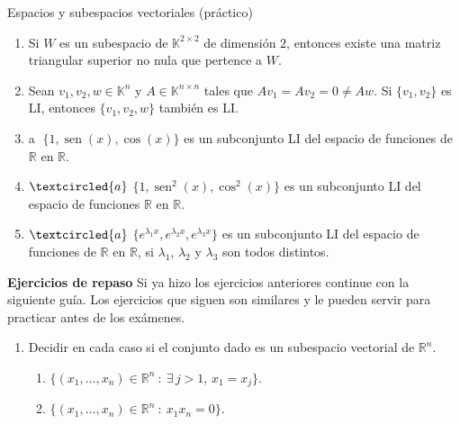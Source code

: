 \begin{chapter}{Espacios y subespacios vectoriales (práctico)}
\begin{enumerate}[resume, topsep=6pt, itemsep=.4cm]
\begin{enumerate}
  \item Si $W$ es un subespacio de $\mathbb{K}^{2\times2}$ de dimensión $2$, entonces existe una matriz triangular superior no nula que pertence a $W$.

 \item Sean $v_1, v_2, w\in \mathbb{K}^{n}$ y $A\in\mathbb{K}^{n\times n}$ tales que $Av_1=Av_2=0\neq Aw$. Si $\{v_1, v_2\}$ es LI, entonces $\{v_1,v_2,w\}$ también es LI.

\item\label{cos} \textcircled{a} $\{1, \operatorname{sen}(x),\cos(x)\}$ es un subconjunto LI del espacio de funciones de $\mathbb{R}$ en $\mathbb{R}$.

\item\label{cos2} $\textcircled{a}$ $\{1,\operatorname{sen}^2(x),\cos^2(x)\}$ es un subconjunto LI del espacio de funciones $\mathbb{R}$ en $\mathbb{R}$.

\item\label{exponencial} $\textcircled{a}$ $\{e^{\lambda_1x},e^{\lambda_2x},e^{\lambda_3x}\}$ es un subconjunto LI del espacio de funciones de
$\mathbb{R}$ en $\mathbb{R}$, si $\lambda_1$, $\lambda_2$ y $\lambda_3$ son todos distintos.
\end{enumerate}

%



\end{enumerate}


\textbf{Ejercicios de repaso}
Si ya hizo los ejercicios anteriores continue con la siguiente guía. Los ejercicios que siguen son similares y le pueden servir para practicar antes de los exámenes.


\begin{enumerate}[resume, topsep=6pt, itemsep=.4cm]

\item Decidir en cada caso si el conjunto dado es un subespacio vectorial de $\mathbb{R}^{n}$.
    \begin{enumerate}
        \item $\{(x_1, \ldots ,x_n) \in \mathbb{R}^n \ : \ \exists \, j > 1, \, x_1 = x_j\}$.
        \item $\{(x_1, \ldots , x_n) \in\mathbb{R}^n \ : \ x_1x_n = 0 \}$.
    \end{enumerate}



\end{enumerate}
\end{chapter}
